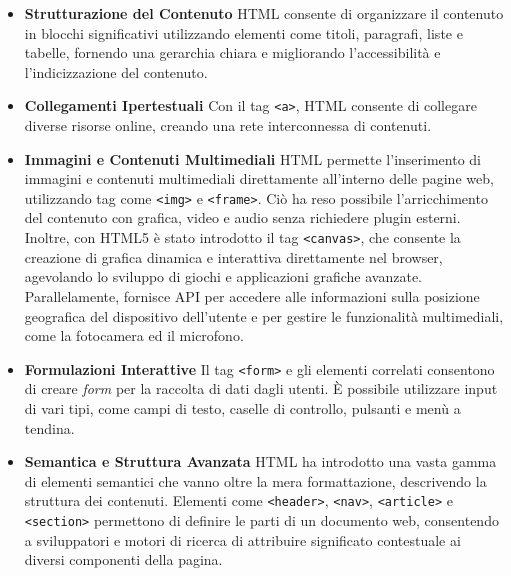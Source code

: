 \begin{itemize}
    \item \textbf{Strutturazione del Contenuto} \newline
        \indent\hspace{5mm} HTML consente di organizzare il contenuto in blocchi significativi utilizzando elementi come titoli, paragrafi, liste e tabelle, fornendo una gerarchia chiara e migliorando l’accessibilità e l’indicizzazione del contenuto.
    \item \textbf{Collegamenti Ipertestuali} \newline
    \indent\hspace{5mm} Con il tag \texttt{<a>}, HTML consente di collegare diverse risorse online, creando una rete interconnessa di contenuti.
    \item \textbf{Immagini e Contenuti Multimediali} \newline
    \indent\hspace{5mm} HTML permette l’inserimento di immagini e contenuti multimediali direttamente all’interno delle pagine web, utilizzando tag come \texttt{<img>} e \texttt{<frame>}. Ciò ha reso possibile l’arricchimento del contenuto con grafica, video e audio senza richiedere plugin esterni. Inoltre, con HTML5 è stato introdotto il tag \texttt{<canvas>}, che consente la creazione di grafica dinamica e interattiva direttamente nel browser, agevolando lo sviluppo di giochi e applicazioni grafiche avanzate. Parallelamente, fornisce API per accedere alle informazioni sulla posizione geografica del dispositivo dell’utente e per gestire le funzionalità multimediali, come la fotocamera ed il microfono.
    \item \textbf{Formulazioni Interattive} \newline
    \indent\hspace{5mm} Il tag \texttt{<form>} e gli elementi correlati consentono di creare \textit{form} per la raccolta di dati dagli utenti. È possibile utilizzare input di vari tipi, come campi di testo, caselle di controllo, pulsanti e menù a tendina.
    \item \textbf{Semantica e Struttura Avanzata} \newline
    \indent\hspace{5mm} HTML ha introdotto una vasta gamma di elementi semantici che vanno oltre la mera formattazione, descrivendo la struttura dei contenuti. Elementi come \texttt{<header>}, \texttt{<nav>}, \texttt{<article>} e \texttt{<section>} permettono di definire le parti di un documento web, consentendo a sviluppatori e motori di ricerca di attribuire significato contestuale ai diversi componenti della pagina.
\end{itemize}

